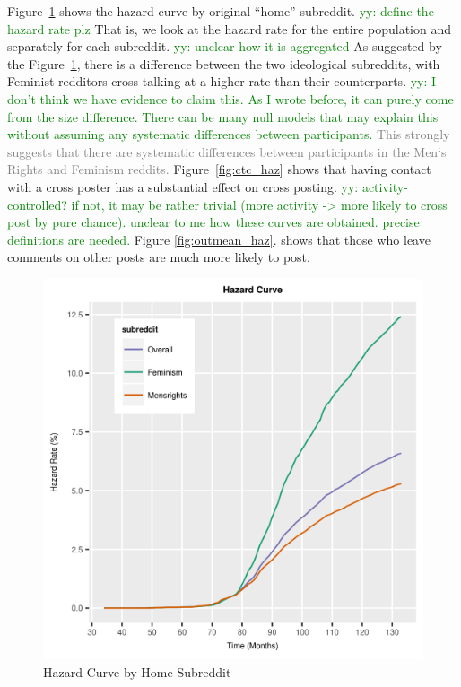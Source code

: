 \documentclass[letterpaper]{article}
\newcommand{\yy}[1]{{\textcolor{green}{yy: #1}}}
\newcommand{\del}[1]{{\textcolor{gray}{#1}}}
\begin{document}
Figure~\ref{fig:bc_haz} shows the hazard curve by original ``home'' subreddit. \yy{define the hazard rate plz} That is, we look at the hazard rate for the entire population and separately for each subreddit. \yy{unclear how it is aggregated} As suggested by the Figure~\ref{fig:bc_haz}, there is a difference between the two ideological subreddits, with Feminist redditors cross-talking at a higher rate than their counterparts. \yy{I don't think we have evidence to claim this. As I wrote before, it can purely come from the size difference. There can be many null models that may explain this without assuming any systematic differences between participants.} \del{This strongly suggests that there are systematic differences between participants in the Men`s Rights and Feminism reddits.} Figure~\ref{fig:ctc_haz} shows that having contact with a cross poster has a substantial effect on cross posting. \yy{activity-controlled? if not, it may be rather trivial (more activity -> more likely to cross post by pure chance). unclear to me how these curves are obtained. precise definitions are needed. } Figure \ref{fig:outmean_haz}. shows that those who leave comments on other posts are much more likely to post.

\begin{figure}[ht]{}
\centering
    \includegraphics[scale=0.75]{Overall_Hazard_thick}
    \caption{Hazard Curve by Home Subreddit}
    \label{fig:bc_haz}
\end{figure}
\end{document}
